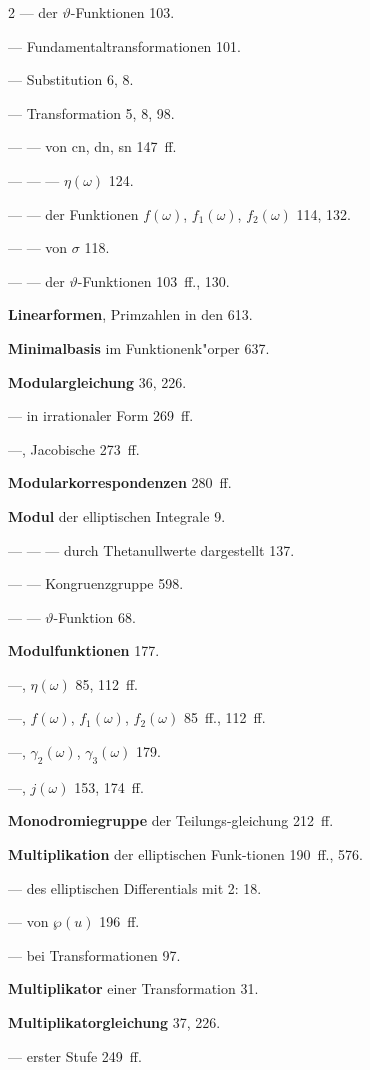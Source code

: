 \documentclass[12pt,a4paper]{article}
\begin{document}
\begin{multicols}{2}
--- der $\vartheta$-Funktionen 103.

--- Fundamentaltransformationen 101.

--- Substitution 6, 8.

--- Transformation 5, 8, 98.

--- --- von cn, dn, sn 147~ff.

--- --- --- $\eta(\omega)$ 124.

--- --- der Funktionen $f(\omega)$, $f_1(\omega)$, $f_2(\omega)$ 114, 132.

--- --- von $\sigma$ 118.

--- --- der $\vartheta$-Funktionen 103~ff., 130.

\textbf{Linearformen}, Primzahlen in den 613.

\bigskip

\textbf{Minimalbasis} im Funktionenk"orper 637.

\textbf{Modulargleichung} 36, 226.

--- in irrationaler Form 269~ff.

---, Jacobische 273~ff.

\textbf{Modularkorrespondenzen} 280~ff.

\textbf{Modul} der elliptischen Integrale 9.

--- --- --- durch Thetanullwerte dargestellt 137.

--- --- Kongruenzgruppe 598.

--- --- $\vartheta$-Funktion 68.

\textbf{Modulfunktionen} 177.

---, $\eta(\omega)$ 85, 112~ff.

---, $f(\omega)$, $f_1(\omega)$, $f_2(\omega)$ 85~ff., 112~ff.

---, $\gamma_2(\omega)$, $\gamma_3(\omega)$ 179.

---, $j(\omega)$ 153, 174~ff.

\textbf{Monodromiegruppe} der Teilungs{-}gleichung 212~ff.

\textbf{Multiplikation} der elliptischen Funk{-}tionen 190~ff., 576.

--- des elliptischen Differentials mit 2: 18.

--- von $\wp(u)$ 196~ff.

--- bei Transformationen 97.

\textbf{Multiplikator} einer Transformation 31.

\textbf{Multiplikatorgleichung} 37, 226.

--- erster Stufe 249~ff.


\end{multicols}
\end{document}
